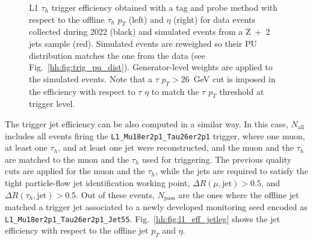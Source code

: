 \documentclass[../main.tex]{subfiles}
\begin{document}
\begin{figure}[h!]
\begin{center}
\end{center}
\caption[L1 $\tau_h$ trigger efficiency]{L1 $\tau_h$ trigger efficiency obtained with a tag and probe method with respect to the offline $\tau_h$ $p_T$ (left) and $\eta$ (right) for data events collected during 2022 (black) and simulated events from a Z~+~2 jets sample (red). Simulated events are reweighed so their PU distribution matches the one from the data (see Fig.~\ref{hh:fig:trig_pu_dist}). Generator-level weights are applied to the simulated events. Note that a $\tau$ $p_T>26$~GeV cut is imposed in the efficiency with respect to $\tau$ $\eta$ to match the $\tau$ $p_T$  threshold at trigger level.}
\label{hh:fig:l1_eff_tauleg}
\end{figure}

The trigger jet efficiency can be also computed in a similar way. In this case, $N_\text{all}$ includes all events firing the \texttt{L1\_Mu18er2p1\_Tau26er2p1} trigger, where one muon, at least one $\tau_h$, and at least one jet were reconstructed, and the muon and the $\tau_h$ are matched to the muon and the $\tau_h$ used for triggering. The previous quality cuts are applied for the muon and the $\tau_h$, while the jets are required to satisfy the tight particle-flow jet identification working point, $\Delta R(\mu, \text{jet}) > 0.5$, and $\Delta R(\tau_h, \text{jet}) > 0.5$. Out of these events, $N_\text{pass}$ are the ones where the offline jet matched a trigger jet associated to a newly developed monitoring seed encoded as \texttt{L1\_Mu18er2p1\_Tau26er2p1\_Jet55}. Fig.~\ref{hh:fig:l1_eff_jetleg} shows the jet efficiency with respect to the offline jet $p_T$ and $\eta$.
\end{document}

